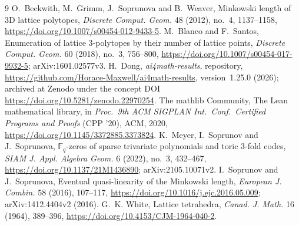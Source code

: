 \documentclass[11pt]{article}
\theoremstyle{definition}
\theoremstyle{remark}
\newcommand{\repoversion}{1.25.0}
\begin{document}
{\small
\begin{thebibliography}{9}
\setlength{\itemsep}{1pt}
 O.~Beckwith, M.~Grimm, J.~Soprunova and B.~Weaver, Minkowski
length of 3D lattice polytopes, \emph{Discrete Comput. Geom.} 48 (2012),
no.~4, 1137--1158, \url{https://doi.org/10.1007/s00454-012-9433-5}.
 M.~Blanco and F.~Santos, Enumeration of lattice 3-polytopes by
their number of lattice points, \emph{Discrete Comput. Geom.} 60 (2018),
no.~3, 756--800, \url{https://doi.org/10.1007/s00454-017-9932-5};
arXiv:1601.02577v3.
 H.~Dong, \emph{ai4math-results}, repository,
\url{https://github.com/Horace-Maxwell/ai4math-results}, version~\repoversion{}
(2026); archived at Zenodo under the concept DOI
\url{https://doi.org/10.5281/zenodo.22970254}.
The mathlib Community, The Lean mathematical library, in \emph{Proc.\ 9th ACM
SIGPLAN Int.\ Conf.\ Certified Programs and Proofs} (CPP '20), ACM, 2020,
\url{https://doi.org/10.1145/3372885.3373824}.
 K.~Meyer, I.~Soprunov and J.~Soprunova, $\mathbb F_q$-zeros of
sparse trivariate polynomials and toric 3-fold codes, \emph{SIAM J. Appl.
Algebra Geom.} 6 (2022), no.~3, 432--467,
\url{https://doi.org/10.1137/21M1436890}; arXiv:2105.10071v2.
 I.~Soprunov and J.~Soprunova, Eventual quasi-linearity of the
Minkowski length, \emph{European J. Combin.} 58 (2016), 107--117,
\url{https://doi.org/10.1016/j.ejc.2016.05.009}; arXiv:1412.4404v2 (2016).
 G.~K. White, Lattice tetrahedra, \emph{Canad. J. Math.} 16
(1964), 389--396, \url{https://doi.org/10.4153/CJM-1964-040-2}.
\end{thebibliography}}
\end{document}

